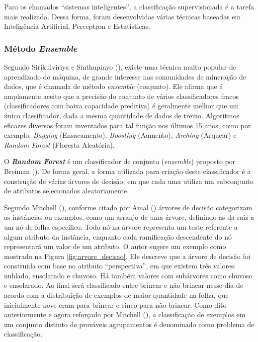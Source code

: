 Para os chamados “sistemas inteligentes”, a classificação supervisionada é a tarefa mais realizada. Dessa forma, foram desenvolvidas várias técnicas baseadas em Inteligência Artificial, Perceptron e Estatísticas.
	
\subsubsection{Método \textit{Ensemble}}
\label{ensemble}
Segundo Sirikulviriya e Sinthupinyo (\citeyear{SirikulviriyaIntegrationOR}), existe uma técnica muito popular de aprendizado de máquina, de grande interesse nas comunidades de mineração de dados, que é chamada de método \textit{ensemble} (conjunto). Ele afirma que é amplamente aceito que a precisão do conjunto de vários classificadores fracos (classificadores com baixa capacidade preditiva) é geralmente melhor que um único classificador, dada a mesma quantidade de dados de treino. Algoritmos eficazes diversos foram inventados para tal função nos últimos 15 anos, como por exemplo: \textit{Bagging} (Ensacamento), \textit{Boosting} (Aumento), \textit{Arching} (Arquear) e \textit{Random Forest} (Floresta Aleatória).

O \textbf{\textit{Random Forest}} é um classificador de conjunto (\textit{ensemble}) proposto por Breiman (\citeyear{Breiman:2001:RF:570181.570182}). De forma geral, a forma utilizada para criação deste classificador é a construção de várias árvores de decisão, em que cada uma utiliza um subconjunto de atributos selecionados aleatoriamente.

Segundo Mitchell (\citeyear{Mitchell:1997:ML:541177}), conforme citado por Amal (\citeyear{Amal}) árvores de decisão categorizam as instâncias ou exemplos, como um arranjo de uma árvore, definindo-as da raiz a um nó de folha específico. Todo nó na árvore representa um teste referente a algum atributo da instância, enquanto cada ramificação descendente do nó representará um valor de um atributo. O autor sugere um exemplo como mostrado na Figura \ref{fig:arvore_decisao}. Ele descreve que a árvore de decisão foi construída com base no atributo “perspectiva”, em que existem três valores: nublado, ensolarado e chuvoso. Há também valores com subárvores como chuvoso e ensolarado. Ao final será classificado entre brincar e não brincar nesse dia de acordo com a distribuição de exemplos de maior quantidade na folha, que inicialmente nove eram para brincar e cinco para não brincar. Como dito anteriormente e agora reforçado por Mitchell (\citeyear{Mitchell:1997:ML:541177}), a classificação de exemplos em um conjunto distinto de prováveis agrupamentos é denominado como problema de classificação.

